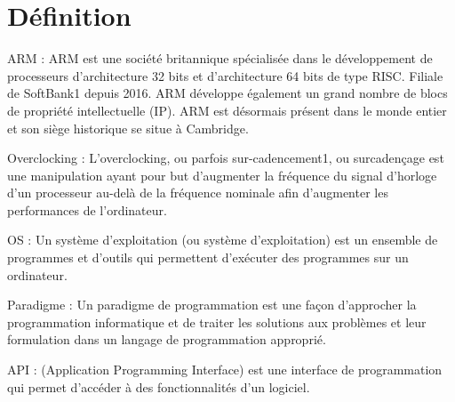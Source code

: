 
\chapter*{Définition}
    \begin{definition}
        \newcommand{\lab}[1]{(\ref{#1})}

        ARM : ARM est une société britannique spécialisée dans le développement de processeurs d'architecture 32 bits et d'architecture 64 bits de type RISC. Filiale de SoftBank1 depuis 2016. ARM développe également un grand nombre de blocs de propriété intellectuelle (IP). ARM est désormais présent dans le monde entier et son siège historique se situe à Cambridge.

        \label{def:ARM}
    \end{definition}


    \begin{definition}
        \newcommand{\lab}[2]{(\ref{#2})}

        Overclocking : L'overclocking, ou parfois sur-cadencement1, ou surcadençage est une manipulation ayant pour but d'augmenter la fréquence du signal d'horloge d'un processeur au-delà de la fréquence nominale afin d'augmenter les performances de l'ordinateur.

        \label{def:Overclocking}
    \end{definition}

    \begin{definition}
        \newcommand{\lab}[3]{(\ref{#3})}

        OS : Un système d'exploitation (ou système d'exploitation) est un ensemble de programmes et d'outils qui permettent d'exécuter des programmes sur un ordinateur.

        \label{def:OS}
    \end{definition}

    \begin{definition}
        \newcommand{\lab}[4]{(\ref{#4})}

        Paradigme : Un paradigme de programmation est une façon d'approcher la programmation informatique et de traiter les solutions aux problèmes et leur formulation dans un langage de programmation approprié.

        \label{def:Paradigme}
    \end{definition}

    \begin{definition}
        \newcommand{\lab}[5]{(\ref{#5})}

        API : (Application Programming Interface) est une interface de programmation qui permet d'accéder à des fonctionnalités d'un logiciel.

        \label{def:API}
    \end{definition}

